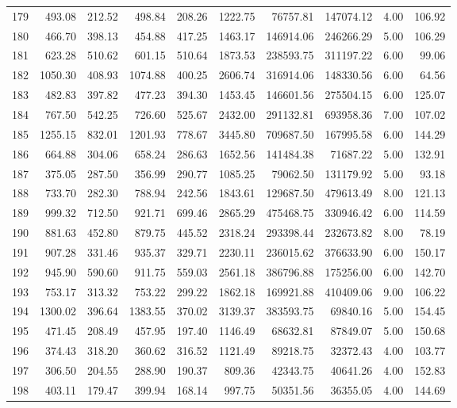 \begin{tabular}{lrrrrrrrrr}
179 & 493.08 & 212.52 & 498.84 & 208.26 & 1222.75 & 76757.81 & 147074.12 & 4.00 & 106.92 \\
180 & 466.70 & 398.13 & 454.88 & 417.25 & 1463.17 & 146914.06 & 246266.29 & 5.00 & 106.29 \\
181 & 623.28 & 510.62 & 601.15 & 510.64 & 1873.53 & 238593.75 & 311197.22 & 6.00 & 99.06 \\
182 & 1050.30 & 408.93 & 1074.88 & 400.25 & 2606.74 & 316914.06 & 148330.56 & 6.00 & 64.56 \\
183 & 482.83 & 397.82 & 477.23 & 394.30 & 1453.45 & 146601.56 & 275504.15 & 6.00 & 125.07 \\
184 & 767.50 & 542.25 & 726.60 & 525.67 & 2432.00 & 291132.81 & 693958.36 & 7.00 & 107.02 \\
185 & 1255.15 & 832.01 & 1201.93 & 778.67 & 3445.80 & 709687.50 & 167995.58 & 6.00 & 144.29 \\
186 & 664.88 & 304.06 & 658.24 & 286.63 & 1652.56 & 141484.38 & 71687.22 & 5.00 & 132.91 \\
187 & 375.05 & 287.50 & 356.99 & 290.77 & 1085.25 & 79062.50 & 131179.92 & 5.00 & 93.18 \\
188 & 733.70 & 282.30 & 788.94 & 242.56 & 1843.61 & 129687.50 & 479613.49 & 8.00 & 121.13 \\
189 & 999.32 & 712.50 & 921.71 & 699.46 & 2865.29 & 475468.75 & 330946.42 & 6.00 & 114.59 \\
190 & 881.63 & 452.80 & 879.75 & 445.52 & 2318.24 & 293398.44 & 232673.82 & 8.00 & 78.19 \\
191 & 907.28 & 331.46 & 935.37 & 329.71 & 2230.11 & 236015.62 & 376633.90 & 6.00 & 150.17 \\
192 & 945.90 & 590.60 & 911.75 & 559.03 & 2561.18 & 386796.88 & 175256.00 & 6.00 & 142.70 \\
193 & 753.17 & 313.32 & 753.22 & 299.22 & 1862.18 & 169921.88 & 410409.06 & 9.00 & 106.22 \\
194 & 1300.02 & 396.64 & 1383.55 & 370.02 & 3139.37 & 383593.75 & 69840.16 & 5.00 & 154.45 \\
195 & 471.45 & 208.49 & 457.95 & 197.40 & 1146.49 & 68632.81 & 87849.07 & 5.00 & 150.68 \\
196 & 374.43 & 318.20 & 360.62 & 316.52 & 1121.49 & 89218.75 & 32372.43 & 4.00 & 103.77 \\
197 & 306.50 & 204.55 & 288.90 & 190.37 & 809.36 & 42343.75 & 40641.26 & 4.00 & 152.83 \\
198 & 403.11 & 179.47 & 399.94 & 168.14 & 997.75 & 50351.56 & 36355.05 & 4.00 & 144.69 \\

\end{tabular}
